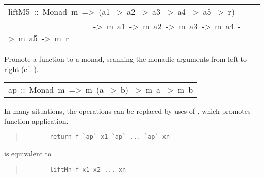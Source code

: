 \begin{haddockdesc}
\item[\begin{tabular}{@{}l}
liftM5\ ::\ Monad\ m\ =>\ (a1\ ->\ a2\ ->\ a3\ ->\ a4\ ->\ a5\ ->\ r)\\\ \ \ \ \ \ \ \ \ \ \ \ \ \ \ \ \ \ \ \ \ ->\ m\ a1\ ->\ m\ a2\ ->\ m\ a3\ ->\ m\ a4\ ->\ m\ a5\ ->\ m\ r
\end{tabular}]\haddockbegindoc
Promote a function to a monad, scanning the monadic arguments from
 left to right (cf. ).
\par

\end{haddockdesc}
\begin{haddockdesc}
\item[\begin{tabular}{@{}l}
ap\ ::\ Monad\ m\ =>\ m\ (a\ ->\ b)\ ->\ m\ a\ ->\ m\ b
\end{tabular}]\haddockbegindoc
In many situations, the  operations can be replaced by uses of
, which promotes function application. 
\par
\begin{quote}
{\haddockverb\begin{verbatim}
       return f `ap` x1 `ap` ... `ap` xn
\end{verbatim}}
\end{quote}
is equivalent to 
\par
\begin{quote}
{\haddockverb\begin{verbatim}
       liftMn f x1 x2 ... xn
\end{verbatim}}
\end{quote}

\end{haddockdesc}
